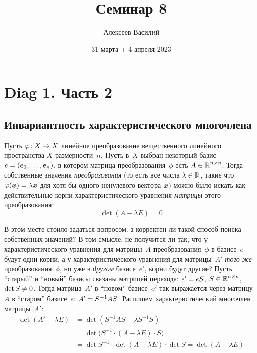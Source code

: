 \documentclass[a4paper,12pt]{article}
\author{Алексеев Василий}
\title{Семинар 8}
\date{31 марта + 4 апреля 2023}
\begin{document}
  \maketitle
  
  \tableofcontents

  \thispagestyle{empty}
  
  \newpage
  


  \section{Diag 1. Часть 2}
  
  \subsection{Инвариантность характеристического многочлена}
  
  Пусть $\phi\colon X \hm\to X$ линейное преобразование вещественного линейного пространства $X$ размерности~$n$.
  Пусть в~$X$ выбран некоторый базис $e \hm= (\bds e_1, \ldots, \bds e_n)$, в котором матрица преобразования~$\phi$ есть $A \hm\in \RR^{n \times n}$.
  Тогда собственные значения \emph{преобразования} (то есть все числа $\lambda \hm\in \RR$, такие что $\phi(\bds x) \hm= \lambda \bds x$ для хотя бы одного ненулевого вектора $\boldsymbol x$) можно было искать как действительные корни характеристического уравнения \emph{матрицы} этого преобразования:
  \begin{equation}\label{eq:characteristic}
    \det (A - \lambda E) = 0
  \end{equation}
  
  В этом месте стоило задаться вопросом: а корректен ли такой способ поиска собственных значений?
  В том смысле, не получится ли так, что у характеристического уравнения для матрицы~$A$ преобразования~$\phi$ в базисе~$e$ будут одни корни, а у характеристического уравнения для матрицы~$A'$ \emph{того же} преобразования~$\phi$, но уже в \emph{другом} базисе~$e'$, корни будут другие?  %
  Пусть ``старый'' и ``новый'' базисы связаны матрицей перехода: $e' \hm= e S$, $S \hm\in \RR^{n\times n}$, $\det S \hm{\not=} 0$.
  Тогда матрица~$A'$ в ``новом'' базисе~$e'$ так выражается через матрицу~$A$ в ``старом'' базисе~$e$: $A' \hm= S^{-1} A S$.
  Распишем характеристический многочлен матрицы~$A'$:
  \begin{equation*}
  \begin{split}
    \det(A' - \lambda E)
      &= \det(S^{-1} A S - \lambda S^{-1} S)\\
      &= \det\bigl(S^{-1} \cdot (A - \lambda E) \cdot S\bigr)\\
      &= \det S^{-1} \cdot \det(A - \lambda E) \cdot \det S
      = \det(A - \lambda E)
  \end{split}
  \end{equation*}
  
\end{document}
